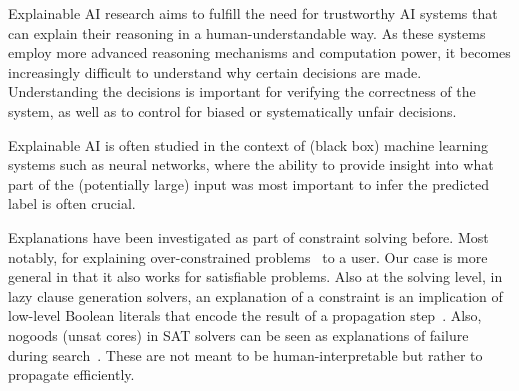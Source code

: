 

Explainable AI research aims to fulfill the need for trustworthy AI systems that can explain their reasoning in a human-understandable way. 
As these systems employ more advanced reasoning mechanisms and computation power, it becomes increasingly difficult to understand why certain decisions are made. 
Understanding the decisions is important for verifying the correctness of the system, as well as to control for biased or systematically unfair decisions.

Explainable AI is often studied in the context of (black box) machine learning systems such as neural networks, where the ability to provide insight into what part of the (potentially large) input was most important to infer the predicted label is often crucial. 

Explanations have been investigated as part of constraint solving before. Most notably, for explaining over-constrained problems~\cite{junker2001quickxplain} to a user. Our case is more general in that it also works for satisfiable problems. 
Also at the solving level, in lazy clause generation solvers, an explanation of a constraint is an implication of low-level Boolean literals that encode the result of a propagation step~\cite{feydy2009lazy}. Also, nogoods (unsat cores) in SAT solvers can be seen as explanations of failure during search~\cite{marques2009conflict}. These are not meant to be human-interpretable but rather to propagate efficiently.


